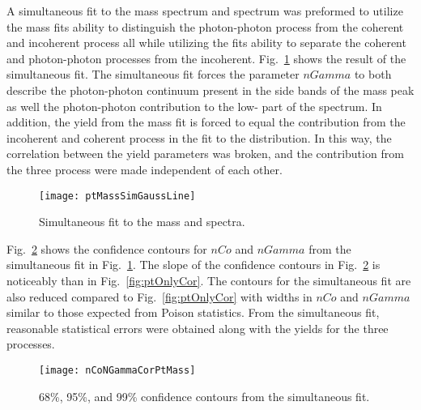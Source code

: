     A simultaneous fit to the mass spectrum and \pt{} 
      spectrum was preformed to utilize the mass fits ability to distinguish 
      the photon-photon process from the coherent and incoherent process all 
      while utilizing the \pt{} fits ability to separate the coherent and 
      photon-photon processes from the incoherent.
    Fig.~\ref{fig:simFitMassPtGauss} shows the result of the simultaneous fit.
    The simultaneous fit forces the parameter $nGamma$ to both describe the 
      photon-photon continuum present in the side bands of the \JPsi{} mass 
      peak as well the photon-photon contribution to the low-\pt{} part of 
      the \pt{} spectrum.
    In addition, the \JPsi{} yield from the mass fit is forced to equal the
      contribution from the incoherent and coherent process in the 
      fit to the \pt{} distribution. 
    In this way, the correlation between the yield parameters was broken, and 
      the contribution from the three process were made independent of each 
      other.

    \begin{figure}[!Hhbt]
      \centering
      \texttt{[image: ptMassSimGaussLine]}
      \caption{Simultaneous fit to the mass and \pt{} spectra.}
      \label{fig:simFitMassPtGauss}
    \end{figure}

    Fig.~\ref{fig:simGaussCor} shows the confidence contours for $nCo$ and 
      $nGamma$ from the simultaneous fit in Fig.~\ref{fig:simFitMassPtGauss}.  
    The slope of the confidence contours in Fig.~\ref{fig:simGaussCor} 
      is noticeably than in Fig.~\ref{fig:ptOnlyCor}.
    The contours for the simultaneous fit are also reduced compared to 
      Fig.~\ref{fig:ptOnlyCor} with widths in $nCo$ and $nGamma$ similar to 
      those expected from Poison statistics. 
    From the simultaneous fit, reasonable statistical errors were obtained 
      along with the yields for the three processes. 

    \begin{figure}[!Hhbt]
      \centering
      \texttt{[image: nCoNGammaCorPtMass]}
      \caption{68\%, 95\%, and 99\% confidence contours from the 
        simultaneous fit. }
      \label{fig:simGaussCor}
    \end{figure}

